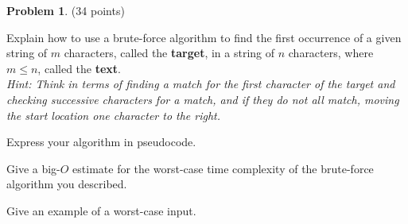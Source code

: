 \documentclass{article}
\theoremstyle{definition}
\newtheorem{problem}{Problem}
\begin{document}
\newpage

\begin{problem} (34 points)
\begin{compactenum}
\renewcommand{\theenumi}{\alph{enumi}}
\item Explain how to use a brute-force algorithm to find the first occurrence of a given string of $m$ characters, called the \textbf{target}, in a string of $n$ characters, where $m \leq n$, called the \textbf{text}.\\
\textit{Hint: Think in terms of finding a match for the first character of the target and checking successive characters for a match, and if they do not all match, moving the start location one character to the right.}
\item Express your algorithm in pseudocode.
\item Give a big-$O$ estimate for the worst-case time complexity of the brute-force algorithm you described.
\item Give an example of a worst-case input.
\end{compactenum}
\end{problem}
\end{document}
